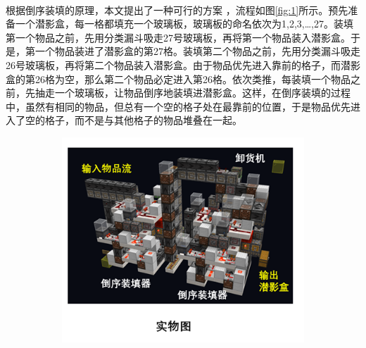 \documentclass[UTF8,12pt,punct=kaiming,fontset=none]{ctexart}
\newcommand*{\upcite}[1]{
    \textsuperscript{\cite{#1}}
}
\begin{document}
根据倒序装填的原理，本文提出了一种可行的方案\upcite{ref1}，流程如图\ref{fig:1}所示。预先准备一个潜影盒，每一格都填充一个玻璃板，玻璃板的命名依次为1,2,3,…,27。装填第一个物品之前，先用分类漏斗吸走27号玻璃板，再将第一个物品装入潜影盒。于是，第一个物品装进了潜影盒的第27格。装填第二个物品之前，先用分类漏斗吸走26号玻璃板，再将第二个物品装入潜影盒。由于物品优先进入靠前的格子，而潜影盒的第26格为空，那么第二个物品必定进入第26格。依次类推，每装填一个物品之前，先抽走一个玻璃板，让物品倒序地装填进潜影盒。这样，在倒序装填的过程中，虽然有相同的物品，但总有一个空的格子处在最靠前的位置，于是物品优先进入了空的格子，而不是与其他格子的物品堆叠在一起。

\begin{figure}
    \centering
    \begin{subfigure}{0.45\linewidth}
        \centering
        \includegraphics[width=\linewidth]{图片2.png}
        

\end{subfigure}
\end{figure}
\end{document}
